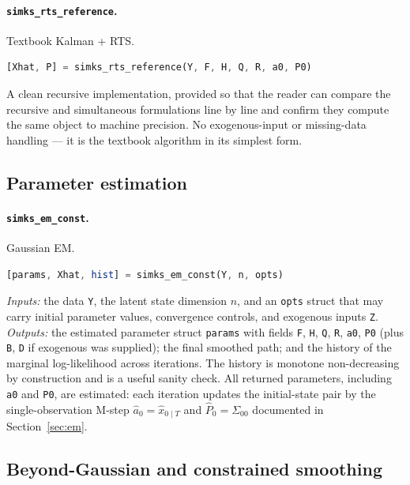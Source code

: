 \documentclass[11pt]{article}
\begin{document}
\paragraph{\texttt{simks\_rts\_reference}.}  Textbook Kalman + RTS.
\begin{lstlisting}[language=Octave]
[Xhat, P] = simks_rts_reference(Y, F, H, Q, R, a0, P0)
\end{lstlisting}
A clean recursive implementation, provided so that the reader can
compare the recursive and simultaneous formulations line by line and
confirm they compute the same object to machine precision.  No
exogenous-input or missing-data handling --- it is the textbook
algorithm in its simplest form.

\subsection{Parameter estimation}

\paragraph{\texttt{simks\_em\_const}.}  Gaussian EM.
\begin{lstlisting}[language=Octave]
[params, Xhat, hist] = simks_em_const(Y, n, opts)
\end{lstlisting}
\emph{Inputs:} the data \texttt{Y}, the latent state dimension $n$,
and an \texttt{opts} struct that may carry initial parameter values,
convergence controls, and exogenous inputs \texttt{Z}.
\emph{Outputs:} the estimated parameter struct \texttt{params} with
fields \texttt{F}, \texttt{H}, \texttt{Q}, \texttt{R}, \texttt{a0},
\texttt{P0} (plus \texttt{B}, \texttt{D} if exogenous was supplied);
the final smoothed path; and the history of the marginal
log-likelihood across iterations.  The history is monotone
non-decreasing by construction and is a useful sanity check.  All
returned parameters, including \texttt{a0} and \texttt{P0}, are
estimated: each iteration updates the initial-state pair by the
single-observation M-step $\widehat a_0=\widehat x_{0\mid T}$ and
$\widehat P_0=\Sigma_{00}$ documented in Section~\ref{sec:em}.

\subsection{Beyond-Gaussian and constrained smoothing}
\end{document}
